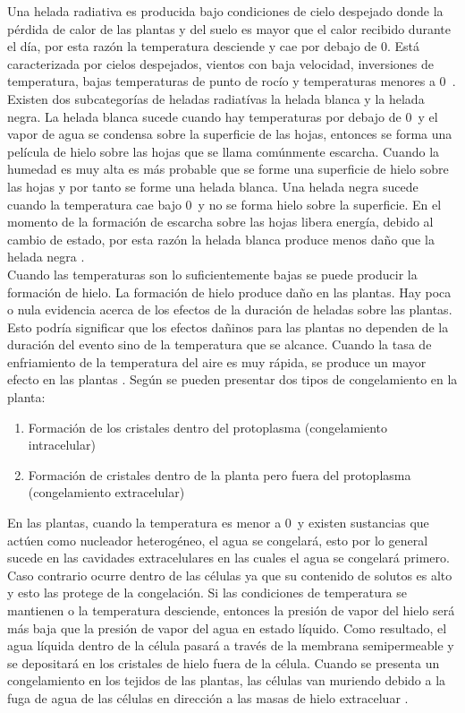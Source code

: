 Una helada radiativa es producida bajo condiciones de cielo despejado donde la pérdida de calor de las plantas y del suelo es mayor que el calor recibido durante el día, por esta razón la temperatura desciende y cae por debajo de 0\celc. Está caracterizada por cielos despejados, vientos con baja velocidad, inversiones de temperatura, bajas temperaturas de punto de rocío y temperaturas menores a 0\celc \   \citep{Halley2003, IDEAM2012a}. Existen dos subcategorías de heladas radiatívas la helada blanca y la helada negra. La helada blanca sucede cuando hay temperaturas por debajo de 0\celc \  y el vapor de agua se condensa sobre la superficie de las hojas, entonces se forma una película de hielo sobre las hojas que se llama comúnmente escarcha. Cuando la humedad es muy alta es más probable que se forme una superficie de hielo sobre las hojas y por tanto se forme una helada blanca. Una helada negra sucede cuando la temperatura cae bajo 0\celc \ y no se forma hielo sobre la superficie. En el momento de la formación de escarcha sobre las hojas libera energía, debido al cambio de estado, por esta razón la helada blanca produce menos daño que la helada negra \citep{Snyder2010}.\\

Cuando las temperaturas son lo suficientemente bajas se puede producir la formación de hielo. La formación de hielo produce daño en las plantas. Hay poca o nula evidencia acerca de los efectos de la duración de heladas sobre las plantas. Esto podría significar que los efectos dañinos para las plantas no dependen de la duración del evento sino de la temperatura que se alcance. Cuando la tasa de enfriamiento de la temperatura del aire es muy rápida, se produce un mayor efecto en las plantas \citep{Snyder2010}. Según \citet{Snyder2005} se pueden presentar dos tipos de congelamiento en la planta:

\begin{enumerate}
\item Formación de los cristales dentro del protoplasma (congelamiento intracelular)
\item Formación de cristales dentro de la planta pero fuera del protoplasma (congelamiento extracelular)
\end{enumerate}

En las plantas, cuando la temperatura es menor a 0\celc \  y existen sustancias que actúen como nucleador heterogéneo, el agua se congelará, esto por lo general sucede en las cavidades extracelulares en las cuales el agua se congelará primero. Caso contrario ocurre dentro de las células ya que su contenido de solutos es alto y esto las protege de la congelación. Si las condiciones de temperatura se mantienen o la temperatura desciende, entonces la presión de vapor del hielo será más baja que la presión de vapor del agua en estado líquido. Como resultado, el agua líquida dentro de la célula pasará a través de la membrana semipermeable y se depositará en los cristales de hielo fuera de la célula. Cuando se presenta un congelamiento en los tejidos de las plantas, las células van muriendo debido a la fuga de agua de las células en dirección a las masas de hielo extraceluar \citep{levitt2012chilling, pearce2001plant}.\\

